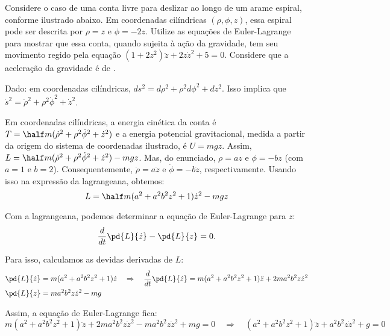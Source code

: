 \begin{question}
	Considere o caso de uma conta livre para deslizar ao longo de um arame espiral, conforme ilustrado abaixo.
	Em coordenadas cilíndricas $(\rho, \phi, z)$, essa espiral pode ser descrita por $\rho = z$ e $\phi = -2z$. %
	Utilize as equações de Euler-Lagrange para mostrar que essa conta, quando sujeita à ação da gravidade, tem seu movimento regido pela equação $(1 + 2z^2)\ddot z + 2z\dot z^2 + 5 = 0$. %
	Considere que a aceleração da gravidade é de .


	\begin{compactdesc}
		\item[Dado:] em coordenadas cilíndricas, $ds^2 = d\rho^2 + \rho^2 d\phi^2 + dz^2$.
		Isso implica que $\dot s^2 = \dot\rho^2 + \rho^2 \dot\phi^2 + \dot z^2$.
	\end{compactdesc}

	\begin{solution}
		Em coordenadas cilíndricas, a energia cinética da conta é $T = \half m (\dot\rho^2 + \rho^2\dot\phi^2 + \dot z^2)$ e a energia potencial gravitacional, medida a partir da origem do sistema de coordenadas ilustrado, é $U = mgz$.
		Assim, $L = \half m (\dot\rho^2 + \rho^2\dot\phi^2 + \dot z^2) - mgz$.
		Mas, do enunciado, $\rho = az$ e $\phi = -bz$ (com $a = 1$ e $b = 2$). %
		Consequentemente, $\dot\rho = a\dot z$ e $\dot \phi = -b\dot z$, respectivamente.
		Usando isso na expressão da lagrangeana, obtemos:
		\begin{equation*}
			L = \half m (a^2 + a^2 b^2 z^2 + 1) \dot z^2 - mgz
		\end{equation*}

		Com a lagrangeana, podemos determinar a equação de Euler-Lagrange para $z$:
		\begin{equation*}
			\frac{d}{dt}\pd{L}{\dot z} - \pd{L}{z} = 0.
		\end{equation*}

		Para isso, calculamos as devidas derivadas de $L$:
		\begin{align*}
			\pd{L}{\dot z} &= m (a^2 + a^2 b^2 z^2 + 1) \dot z \quad\Rightarrow\quad
				\frac{d}{dt}\pd{L}{\dot z} = m (a^2 + a^2 b^2 z^2 + 1) \ddot z + 2ma^2b^2z\dot z^2 \\
			\pd{L}{z} &= ma^2b^2z\dot z^2 - mg
		\end{align*}

		Assim, a equação de Euler-Lagrange fica:
		\begin{equation*}
			m (a^2 + a^2 b^2 z^2 + 1) \ddot z + 2ma^2b^2z\dot z^2 - ma^2b^2z\dot z^2 + mg = 0
			\quad\Rightarrow\quad
			(a^2 + a^2 b^2 z^2 + 1) \ddot z + a^2b^2z\dot z^2 + g = 0
		\end{equation*}


\end{solution}
\end{question}
